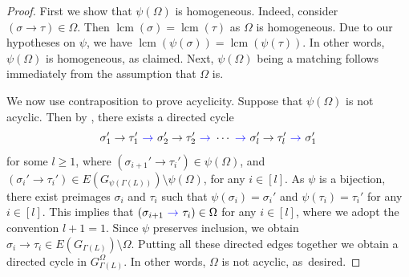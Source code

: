 \documentclass[reqno]{amsart}
\DeclareMathOperator{\lcm}{lcm}
\theoremstyle{definition}
\theoremstyle{remark}
\numberwithin{equation}{section}
\begin{document}
\begin{proof}
    First we show that $\psi(\Omega)$ is homogeneous. Indeed, consider $(\sigma\to  \tau)\in \Omega$. Then $\lcm(\sigma)=\lcm(\tau)$ as $\Omega$ is homogeneous. Due to our hypotheses on $\psi$, we have $\lcm(\psi(\sigma)) =  \lcm(\psi(\tau))$. In other words, $\psi(\Omega)$ is homogeneous, as claimed. Next, $\psi(\Omega)$ being a matching follows immediately from the assumption that $\Omega$ is.

    We now use contraposition to prove acyclicity. Suppose that $\psi(\Omega)$  is not acyclic. Then by \cite[Lemma~3.2.4]{Batzies2002}, there exists a directed cycle
    \[
    \sigma_1' \to \tau_1' \ {\color{blue} \to}\  \sigma_2' \to \tau_2' \ {\color{blue} \to}\  \cdots \ {\color{blue} \to}\  \sigma_l'\to \tau_l' \ {\color{blue} \to}\ \sigma_1'
    \]
    for some $l\geq 1$, where $(\sigma_{i+1}'\to \tau_i') \in \psi(\Omega)$, and $(\sigma_i'\to \tau_i') \in E(G_{\psi(\Gamma(L))})\setminus \psi(\Omega)$,  for any $i\in [l]$. As $\psi$ is a bijection, there exist preimages $\sigma_i$ and $\tau_i$ such that $\psi(\sigma_i)=\sigma_i'$ and $\psi(\tau_i)=\tau_i'$ for any $i\in [l]$. This implies that $ (\sigma_{i+1} \ {\color{blue} \to}\  \tau_{i} ) \in \Omega$ for any $i\in [l]$, where we adopt the convention $l+1=1$. Since $\psi$ preserves inclusion, we obtain $\sigma_i \to \tau_i \in E(G_{\Gamma(L)})\setminus \Omega$. Putting all these directed edges together we obtain a directed cycle in $G_{\Gamma(L)}^{\Omega}$. In other words, $\Omega$ is not acyclic, as~desired.
\end{proof}
\end{document}
